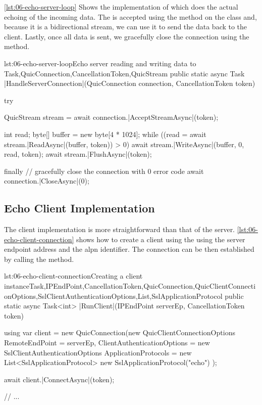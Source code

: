 \autoref{lst:06-echo-server-loop} Shows the implementation of  which
does the actual echoing of the incoming data. The \QuicStream{} is accepted using the
 method on the \QuicConnection{} class and, because it is a bidirectional
stream, we can use it to send the data back to the client. Lastly, once all data is sent, we
gracefully close the connection using the  method.

\begin{myListingCsharpNoPageBreak}{lst:06-echo-server-loop}{Echo server reading and writing data to \QuicStream{}}{Task,QuicConnection,CancellationToken,QuicStream}{}
public static async Task |HandleServerConnection|(QuicConnection connection,
    CancellationToken token)
{
    try
    {
        QuicStream stream = await connection.|AcceptStreamAsync|(token);

        int read;
        byte[] buffer = new byte[4 * 1024];
        while ((read = await stream.|ReadAsync|(buffer, token)) > 0)
        {
            await stream.|WriteAsync|(buffer, 0, read, token);
            await stream.|FlushAsync|(token);
        }
    }
    finally
    {
        // gracefully close the connection with 0 error code
        await connection.|CloseAsync|(0);
    }
}
\end{myListingCsharpNoPageBreak}

\subsection{Echo Client Implementation}

The client implementation is more straightforward than that of the server.
\autoref{lst:06-echo-client-connection} shows how to create a client \QuicConnection{} using the
using the server endpoint address and the \gls{alpn} identifier. The connection can be then
established by calling the  method.

\begin{myListingCsharpNoPageBreak}{lst:06-echo-client-connection}{Creating a client \QuicConnection{} instance}{Task,IPEndPoint,CancellationToken,QuicConnection,QuicClientConnectionOptions,SslClientAuthenticationOptions,List,SslApplicationProtocol}{}
public static async Task<int> |RunClient|(IPEndPoint serverEp,
    CancellationToken token)
{
    using var client = new QuicConnection(new QuicClientConnectionOptions
    {
        RemoteEndPoint = serverEp,
        ClientAuthenticationOptions = new SslClientAuthenticationOptions
        {
            ApplicationProtocols = new List<SslApplicationProtocol>
            {
                new SslApplicationProtocol("echo")
            }
        }
    });

    await client.|ConnectAsync|(token);

    // ...
}
\end{myListingCsharpNoPageBreak}

